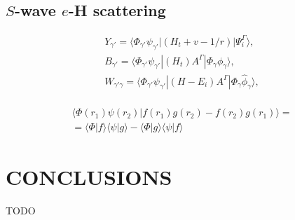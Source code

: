 \documentclass[aip
, pra
, showpacs
, aps
, twocolumn
, groupedaddress
, floatfix
]{revtex4}
\newcommand{\beq}{\begin{equation}}
\newcommand{\eeq}{\end{equation}}
\newcommand{\barr}{\begin{array}}
\newcommand{\earr}{\end{array}}
\begin{document}
\subsection{$S$-wave $e$-H scattering}



\beq \barr{l}
Y_{\gamma'} = \langle \Phi_{\gamma'}  \psi_{\gamma'} |(H_t + v - 1/r)|\Psi_i^{\Gamma} \rangle,\\
B_{\gamma'} = \langle  \Phi_{\gamma'}  \psi_{\gamma'} |(H_t )A^{\Gamma} |\Phi_{\gamma} \phi_{\gamma} \rangle,\\
W_{\gamma' \gamma} = \langle \Phi_{\gamma'}  \psi_{\gamma'} |(H - E_i) A^{\Gamma} |\Phi_{\gamma} \widehat{\phi}_{\gamma} \rangle,\\
\earr \label{Psi_} \eeq

\beq \barr{l}
\langle  \Phi(r_1) \psi(r_2) |f(r_1) g(r_2) - f(r_2) g(r_1) \rangle = \\
=\langle  \Phi |f \rangle  \langle  \psi |g \rangle -
\langle  \Phi |g \rangle  \langle  \psi |f \rangle
\earr \eeq


\section{CONCLUSIONS}
TODO


\begin{acknowledgments}
\end{acknowledgments}





%
\end{document}
